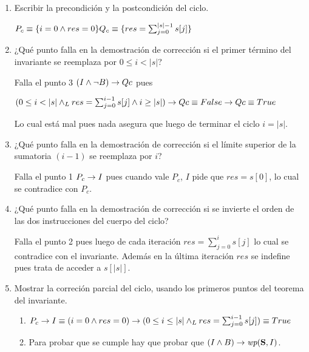 \begin{enumerate}[label=\alph*)]
    \item Escribir la precondición y la postcondición del ciclo.

          $
              P_c \equiv \{i = 0 \land res = 0\}\\
              Q_c \equiv \{res = \sum_{j=0}^{|s| - 1} s[j]\}
          $

    \item ¿Qué punto falla en la demostración de corrección si el primer término del invariante se reemplaza por $0 \leq i < |s|$?

          Falla el punto 3 $(I \land \neg B) \rightarrow Qc$ pues \par
          $(0 \leq i < |s| \land _L res = \sum_{j=0}^{i-1} s[j] \land i \geq |s|) \rightarrow Qc \equiv False \rightarrow Qc \equiv True$

          Lo cual está mal pues nada asegura que luego de terminar el ciclo $i = |s|$.

    \item ¿Qué punto falla en la demostración de corrección si el límite superior de la sumatoria $(i - 1)$ se reemplaza por $i$?

          Falla el punto 1 $P_c \rightarrow I$ pues cuando vale $P_c$, $I$ pide que $res = s[0]$, lo cual se contradice con $P_c$.

    \item ¿Qué punto falla en la demostración de corrección si se invierte el orden de las dos instrucciones del cuerpo del ciclo?

          Falla el punto 2  pues luego de cada iteración $res = \sum_{j=0}^{i} s[j]$ lo cual se contradice con el invariante. Además en la última iteración $res$ se indefine pues trata de acceder a $s[|s|]$.

    \item Mostrar la correción parcial del ciclo, usando los primeros puntos del teorema del invariante.

          \begin{enumerate}[label=\arabic*)]
              \item $P_c \rightarrow I \equiv (i = 0 \land res = 0) \rightarrow (0 \leq i \leq |s| \land _L res = \sum_{j=0}^{i-1} s[j]) \equiv True$

              \item {}

                    Para probar que se cumple hay que probar que $(I \land B) \Then \wp{S}{I}$.


\end{enumerate}
\end{enumerate}
